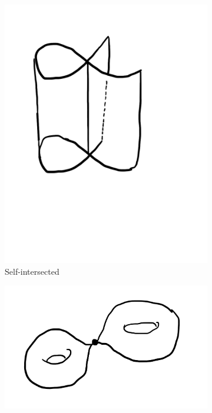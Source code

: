 \begin{figure}
\centering
\begin{subfigure}{0.3\textwidth}
    \centering
    \includegraphics[width=\textwidth]{picture/week4/self-intersetcion.png}
    \caption{Self-intersected}
\end{subfigure}
\begin{subfigure}{0.35\textwidth}
    \centering
    \includegraphics[width=\textwidth]{picture/week4/node.png}

\end{subfigure}
\end{figure}

